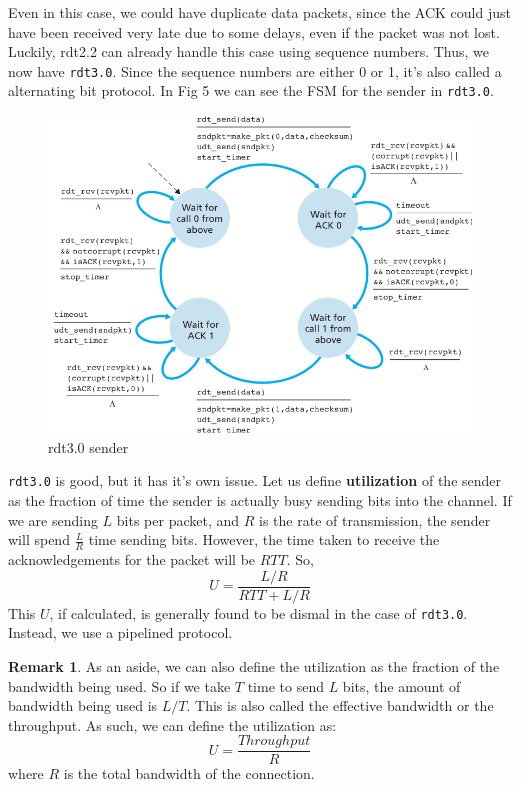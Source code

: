 \documentclass[12pt,letterpaper]{book}
\theoremstyle{definition}
\newtheorem*{remark}{Remark}
\begin{document}
Even in this case, we could have duplicate data packets, since the ACK could just have been received very late due to some delays, even if the packet was not lost. Luckily, rdt2.2 can already handle this case using sequence numbers. Thus, we now have \texttt{rdt3.0}. Since the sequence numbers are either 0 or 1, it's also called a alternating bit protocol. In Fig 5 we can see the FSM for the sender in \texttt{rdt3.0}.

\begin{figure}[htpb]
  \centering
  \includegraphics[width=0.8\linewidth]{./assets/rdt3_fsm.png}
  \caption{rdt3.0 sender}%
  \label{fig:./assets}
\end{figure}

\texttt{rdt3.0} is good, but it has it's own issue. Let us define \textbf{utilization} of the sender as the fraction of time the sender is actually busy sending bits into the channel. If we are sending $L$ bits per packet, and $R$ is the rate of transmission, the sender will spend $\frac{L}{R}$ time sending bits. However, the time taken to receive the acknowledgements for the packet will be $RTT$. So,
\[U = \frac{L/R}{RTT+L/R}\]
This $U$, if calculated, is generally found to be dismal in the case of \texttt{rdt3.0}. Instead, we use a pipelined protocol.

\begin{remark}
  As an aside, we can also define the utilization as the fraction of the bandwidth being used. So if we take $T$ time to send $L$ bits, the amount of bandwidth being used is $L/T$. This is also called the effective bandwidth or the throughput. As such, we can define the utilization as:
\[U = \frac{Throughput}{R}\]
where $R$ is the total bandwidth of the connection.
\end{remark}
\end{document}
